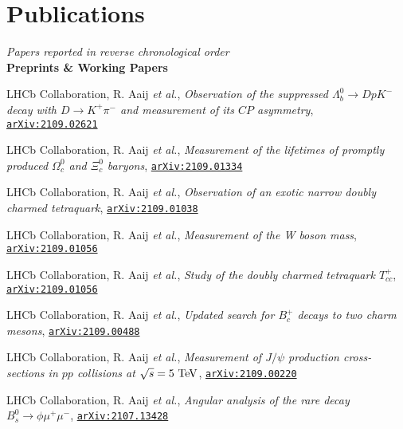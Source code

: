 \newcommand{\journal}[1]
  {\textbf{\large #1}\\\vspace{-5mm}}

\newcommand{\arxiv}[1]
  {\href{https://arxiv.org/abs/#1}{\texttt{arXiv:#1}}}


\section*{Publications}
\begin{cvcontent}
  \emph{Papers reported in reverse chronological order}\\[2.5mm]
  \journal{Preprints \& Working Papers}
  \begin{enumerate}[label={[\arabic*]}, leftmargin=1.5cm]
    \item LHCb Collaboration, R. Aaij \emph{et al.}, \emph{Observation of the suppressed $\Lambda_b^0\to D p K^-$ decay with $D\to K^+ \pi^-$ and measurement of its $C\!P$ asymmetry}, \arxiv{2109.02621}
    \item LHCb Collaboration, R. Aaij \emph{et al.}, \emph{Measurement of the lifetimes of promptly produced $\Omega^{0}_{c}$ and $\Xi^{0}_{c}$ baryons}, \arxiv{2109.01334}
    \item LHCb Collaboration, R. Aaij \emph{et al.}, \emph{Observation of an exotic narrow doubly charmed tetraquark}, \arxiv{2109.01038}
    \item LHCb Collaboration, R. Aaij \emph{et al.}, \emph{Measurement of the W boson mass}, \arxiv{2109.01056}
    \sloppy
    \item LHCb Collaboration, R. Aaij \emph{et al.}, \emph{Study of the doubly charmed tetraquark $T_{cc}^+$}, \arxiv{2109.01056}
    \sloppy
    \item LHCb Collaboration, R. Aaij \emph{et al.}, \emph{Updated search for $B_c^+$ decays to two charm mesons}, \arxiv{2109.00488}
    \item LHCb Collaboration, R. Aaij \emph{et al.}, \emph{Measurement of $J/\psi$ production cross-sections in $pp$ collisions at $\sqrt{s}=5~\rm{TeV}$}, \arxiv{2109.00220}
    \sloppy
    \item LHCb Collaboration, R. Aaij \emph{et al.}, \emph{Angular analysis of the rare decay $B_s^0 \to \phi \mu^+ \mu^-$}, \arxiv{2107.13428}

\end{enumerate}
\end{cvcontent}
